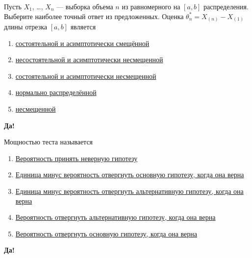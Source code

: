 \documentclass[t]{beamer}
\begin{document}
 \begin{frame} \label{38-Yes} 
\begin{block}{38} 

Пусть $X_1$, \ldots, $X_n$ — выборка объема $n$ из равномерного на $[a, b]$ распределения. Выберите наиболее точный ответ из предложенных. Оценка $\theta^*_n = X_{(n)}-X_{(1)}$ длины отрезка $[a,b]$ является
 


 \end{block} 
\begin{enumerate} 
\item[] \hyperlink{38-No}{\beamergotobutton{} состоятельной и асимптотически смещённой}
\item[] \hyperlink{38-No}{\beamergotobutton{} несостоятельной и асимптотически несмещенной}
\item[] \hyperlink{38-Yes}{\beamergotobutton{} состоятельной и асимптотически несмещенной}
\item[] \hyperlink{38-No}{\beamergotobutton{} нормально распределённой}
\item[] \hyperlink{38-No}{\beamergotobutton{} несмещенной}
\end{enumerate} 

 \textbf{Да!} 
 \hyperlink{39}{}\end{frame} 


 \begin{frame} \label{39-Yes} 
\begin{block}{39} 

Мощностью теста называется
 


 \end{block} 
\begin{enumerate} 
\item[] \hyperlink{39-No}{\beamergotobutton{} Вероятность принять неверную гипотезу}
\item[] \hyperlink{39-No}{\beamergotobutton{} Единица минус  вероятность отвергнуть основную гипотезу, когда она верна}
\item[] \hyperlink{39-Yes}{\beamergotobutton{} Единица минус  вероятность отвергнуть альтернативную гипотезу, когда она верна}
\item[] \hyperlink{39-No}{\beamergotobutton{} Вероятность отвергнуть альтернативную гипотезу, когда она верна}
\item[] \hyperlink{39-No}{\beamergotobutton{} Вероятность отвергнуть основную гипотезу, когда она верна}
\end{enumerate} 

 \textbf{Да!} 
 \hyperlink{40}{}\end{frame} 
\end{document}
